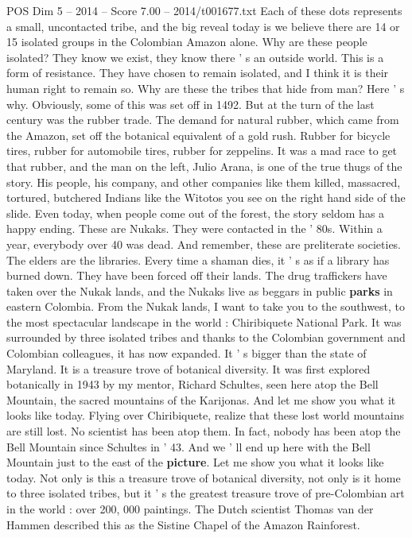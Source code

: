 \begin{textsample}{POS Dim 5 – 2014 – Score 7.00 – 2014/t001677.txt}
Each of these dots represents a small, uncontacted tribe, and the big reveal today is we believe there are 14 or 15 isolated groups in the Colombian Amazon alone.
Why are these people isolated?
They know we exist, they know there ' s an outside world.
This is a form of resistance.
They have chosen to remain isolated, and I think it is their human right to remain so.
Why are these the tribes that hide from man?
Here ' s why.
Obviously, some of this was set off in 1492.
But at the turn of the last century was the rubber trade.
The demand for natural rubber, which came from the Amazon, set off the botanical equivalent of a gold rush.
Rubber for bicycle tires, rubber for automobile tires, rubber for zeppelins.
It was a mad race to get that rubber, and the man on the left, Julio Arana, is one of the true thugs of the story.
His people, his company, and other companies like them killed, massacred, tortured, butchered Indians like the Witotos you see on the right hand side of the slide.
Even today, when people come out of the forest, the story seldom has a happy ending.
These are Nukaks.
They were contacted in the ' 80s.
Within a year, everybody over 40 was dead.
And remember, these are preliterate societies.
The elders are the libraries.
Every time a shaman dies, it ' s as if a library has burned down.
They have been forced off their lands.
The drug traffickers have taken over the Nukak lands, and the Nukaks live as beggars in public \textbf{parks} in eastern Colombia.
From the Nukak lands, I want to take you to the southwest, to the most spectacular landscape in the world : Chiribiquete National Park.
It was surrounded by three isolated tribes and thanks to the Colombian government and Colombian colleagues, it has now expanded.
It ' s bigger than the state of Maryland.
It is a treasure trove of botanical diversity.
It was first explored botanically in 1943 by my mentor, Richard Schultes, seen here atop the Bell Mountain, the sacred mountains of the Karijonas.
And let me show you what it looks like today.
Flying over Chiribiquete, realize that these lost world mountains are still lost.
No scientist has been atop them.
In fact, nobody has been atop the Bell Mountain since Schultes in ' 43.
And we ' ll end up here with the Bell Mountain just to the east of the \textbf{picture}.
Let me show you what it looks like today.
Not only is this a treasure trove of botanical diversity, not only is it home to three isolated tribes, but it ' s the greatest treasure trove of pre-Colombian art in the world : over 200, 000 paintings.
The Dutch scientist Thomas van der Hammen described this as the Sistine Chapel of the Amazon Rainforest.

\end{textsample}
